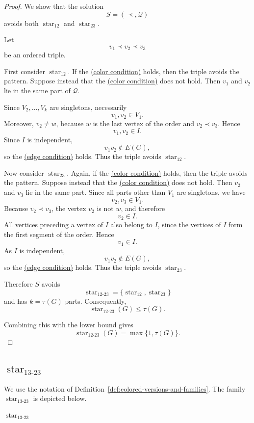 \documentclass[12pt]{article}
\theoremstyle{plain}
\theoremstyle{definition}
\theoremstyle{remark}
\theoremstyle{definition}
\newcommand{\edgecondition}{%
  \hyperref[def:avoid:cond:edge]{(edge condition)}\xspace
}
\newcommand{\colorcondition}{%
  \hyperref[def:avoid:cond:color]{(color condition)}\xspace
}
\newcommand{\starlabel}{\mathrm{star}}
\DeclareRobustCommand{\starparam}[1]{%
  \ensuremath{\mathop{\starlabel}\nolimits_{#1}}%
}
\begin{document}
\begin{proof}
We show that the solution
\[
S=(\prec,\mathcal Q)
\]
avoids both \(\starparam{12}\) and \(\starparam{23}\).

Let
\[
v_1\prec v_2\prec v_3
\]
be an ordered triple.

First consider \(\starparam{12}\). If the \colorcondition{} holds, then
the triple avoids the pattern. Suppose instead that the
\colorcondition{} does not hold. Then \(v_1\) and \(v_2\) lie in the
same part of \(\mathcal Q\).

Since \(V_2,\dots,V_k\) are singletons, necessarily
\[
v_1,v_2\in V_1.
\]
Moreover, \(v_2\neq w\), because \(w\) is the last vertex of the order
and \(v_2\prec v_3\). Hence
\[
v_1,v_2\in I.
\]
Since \(I\) is independent,
\[
v_1v_2\notin E(G),
\]
so the \edgecondition{} holds. Thus the triple avoids
\(\starparam{12}\).

Now consider \(\starparam{23}\). Again, if the \colorcondition{} holds,
then the triple avoids the pattern. Suppose instead that the
\colorcondition{} does not hold. Then \(v_2\) and \(v_3\) lie in the
same part. Since all parts other than \(V_1\) are singletons, we have
\[
v_2,v_3\in V_1.
\]
Because \(v_2\prec v_3\), the vertex \(v_2\) is not \(w\), and therefore
\[
v_2\in I.
\]
All vertices preceding a vertex of \(I\) also belong to \(I\), since the
vertices of \(I\) form the first segment of the order. Hence
\[
v_1\in I.
\]
As \(I\) is independent,
\[
v_1v_2\notin E(G),
\]
so the \edgecondition{} holds. Thus the triple avoids
\(\starparam{23}\).

Therefore \(S\) avoids
\[
\starparam{12\text{-}23}
=
\{\starparam{12},\starparam{23}\}
\]
and has \(k=\tau(G)\) parts. Consequently,
\[
\starparam{12\text{-}23}(G)
\le
\tau(G).
\]

Combining this with the lower bound gives
\[
\starparam{12\text{-}23}(G)
=
\max\{1,\tau(G)\}.
\]
\end{proof}




\subsection{\texorpdfstring{\(\starparam{13\text{-}23}\)}{star13-23}}
\label{subsec:star13-23}

We use the notation of
Definition~\ref{def:colored-versions-and-families}.
The family \(\starparam{13\text{-}23}\) is depicted below.

\begin{center}

\smallskip
\(\starparam{13\text{-}23}\)
\end{center}
\end{document}
